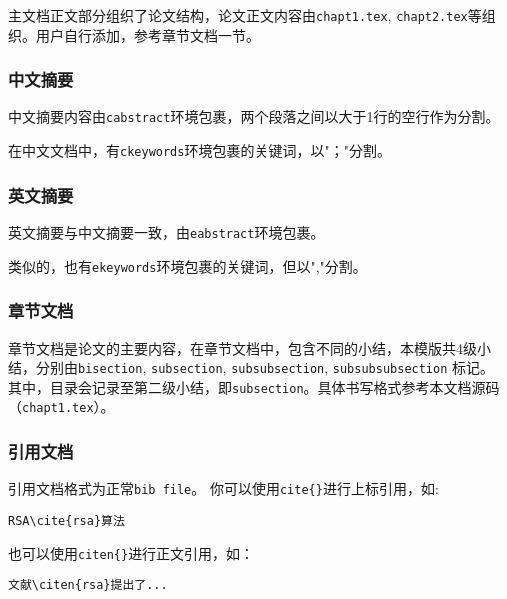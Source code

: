 主文档正文部分组织了论文结构，论文正文内容由\verb |chapt1.tex|, \verb|chapt2.tex|等组织。用户自行添加，参考章节文档一节。%

\subsubsection{中文摘要}

中文摘要内容由\verb|cabstract|环境包裹，两个段落之间以大于1行的空行作为分割。

在中文文档中，有\verb|ckeywords|环境包裹的关键词，以"；"分割。

\subsubsection{英文摘要}

 英文摘要与中文摘要一致，由\verb|eabstract|环境包裹。

 类似的，也有\verb|ekeywords|环境包裹的关键词，但以","分割。

 \subsubsection{章节文档}
 章节文档是论文的主要内容，在章节文档中，包含不同的小结，本模版共4级小结，分别由\verb|bisection|, \verb|subsection|, \verb|subsubsection|,  \verb|subsubsubsection| 标记。
 其中，目录会记录至第二级小结，即\verb|subsection|。具体书写格式参考本文档源码（\verb|chapt1.tex|）。

\subsubsection{引用文档}

引用文档格式为正常\verb|bib file|。 你可以使用\verb|cite{}|进行上标引用，如:

\begin{center}
  \begin{minipage}{0.65\textwidth}
    \begin{Verbatim}[frame=single]
      RSA\cite{rsa}算法
    \end{Verbatim}
  \end{minipage}
\end{center}

也可以使用\verb|citen{}|进行正文引用，如：

\begin{center}
  \begin{minipage}{0.65\textwidth}
    \begin{Verbatim}[frame=single]
      文献\citen{rsa}提出了...
    \end{Verbatim}
  \end{minipage}
\end{center}

